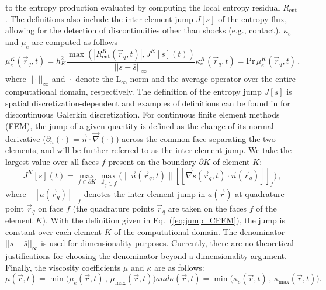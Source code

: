 \documentclass[review,10pt]{elsarticle}
\newcommand{\grad}{\vec{\nabla}}
\newcommand{\jmp}[1]{[\![#1]\!]}                     %
\renewcommand{\Pr}{\textrm{Pr}}
\newcommand{\resi}{R_\text{ent}}
\newcommand{\eqt}[1]{Eq.~(\ref{#1})}                     %
\begin{document}
to the entropy production evaluated by computing the local entropy residual $\resi$. The definitions also include the 
inter-element jump $J[s]$ of the entropy flux, %
allowing for the detection of discontinuities other than shocks (e.g., contact). $\kappa_e$ and $\mu_e$ are computed 
as follows
%
\begin{subequations}
\label{eq:ent_visc_coeff}
\begin{equation}
\mu^K_e(\vec{r}_q,t) =  h_K^2 \frac{\max\left( | \resi^K(\vec{r}_q,t) |, J^K[s](t) \right)}{|| s - \bar{s} ||_\infty}  
\end{equation}
\begin{equation}
\kappa^K_e(\vec{r}_q,t) = \Pr \, \mu^K_e(\vec{r}_q,t) \,,
\end{equation}
\end{subequations}
%
where $|| \cdot ||_\infty$ and $\bar{\cdot}$ denote the L$_\infty$-norm and the average operator over the entire 
computational domain, respectively. The definition of the entropy jump $J[s]$ is spatial discretization-dependent 
and examples of definitions can be found in \cite{valentin} for discontinuous Galerkin discretization. For 
continuous finite element methods (FEM), the jump of a given quantity is defined as the change of its normal 
derivative ($\partial_n ( \cdot ) =  \vec{n} \cdot \grad (\cdot)$) across the common face separating the two elements, and will 
be further referred to as the inter-element jump. We take the largest value over all faces $f$ present on the 
boundary $\partial K$ of element $K$:
%
\begin{equation}
\label{eq:jump_CFEM}
J^K[s](t) = \max_{f\in\partial K}  \max_{\vec{r}_q \in f} \Big( \| \vec{u}(\vec{r}_q,t) \| \jmp{\grad s(\vec{r}_q,t) \cdot \vec{n}(\vec{r}_q) }_f \Big) \, ,
\end{equation}
%
where $\jmp{a(\vec{r}_q)}_f$ denotes the inter-element jump in $a(\vec{r})$ at quadrature point $\vec{r}_q$ on face $f$ 
(the quadrature points $\vec{r}_q$ are taken on the faces $f$ of the element $K$). With the definition given in 
\eqt{eq:jump_CFEM}, the jump is constant over each element $K$ of the computational domain. 
The denominator $|| s - \bar{s} ||_\infty$ is used for dimensionality purposes.
Currently, there are no theoretical justifications for choosing the denominator beyond a dimensionality argument. 
Finally, the viscosity coefficients $\mu$ and $\kappa$ are as follows:
%
\begin{subequations}
\begin{equation}
\mu(\vec{r},t)    = \min\Big( \mu_e(\vec{r},t)   \,,\, \mu_{\max}(\vec{r},t)    \Big) 
\end{equation}
and
\begin{equation}
\kappa(\vec{r},t) = \min\Big( \kappa_e(\vec{r},t)\,,\, \kappa_{\max}(\vec{r},t) \Big) .
\end{equation}
\end{subequations}
\end{document}
